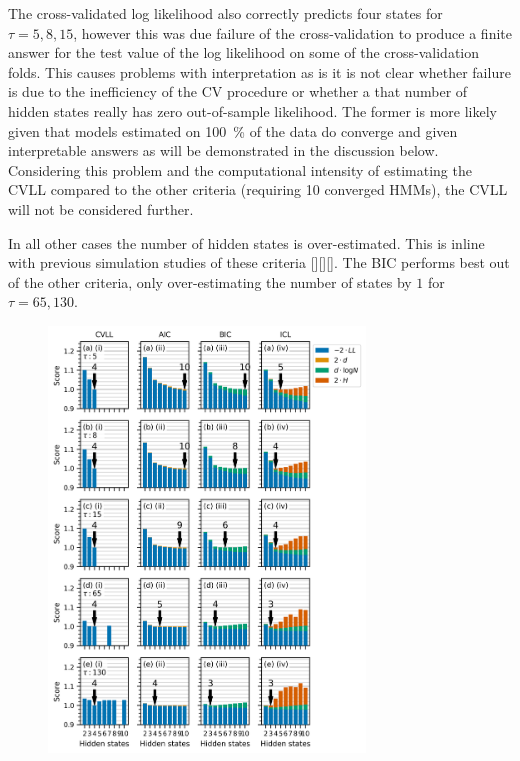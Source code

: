The cross-validated log likelihood also correctly predicts four states for $\tau = 5, 8, 15$, however this was due failure of the cross-validation to produce a finite answer for the test value of the log likelihood on some of the cross-validation folds. This causes problems with interpretation as is it is not clear whether failure is due to the  inefficiency of the CV procedure or whether a that number of hidden states really has zero out-of-sample likelihood. The former is more likely given that models estimated on \SI{100}{\percent} of the data do converge and given interpretable answers as will be demonstrated in the discussion below. Considering this problem and the computational intensity of estimating the CVLL compared to the other criteria (requiring 10 converged HMMs), the CVLL will not be considered further. 

In all other cases the number of hidden states is over-estimated. This is inline with previous simulation studies of these criteria [][][]. The BIC performs best out of the other criteria, only over-estimating the number of states by $1$ for $\tau=65, 130$. 

\begin{figure}
    \centering
    \includegraphics[width=0.75\textwidth]{chapters/hmm_selection/figures/prinz_h_state_selection.png}
    \label{fig:prinz_criteria_results}
\end{figure}

